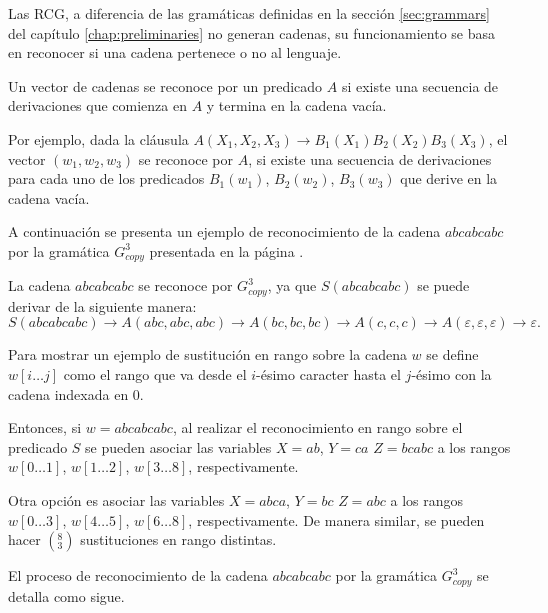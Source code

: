 \documentclass[12pt]{article}
\begin{document}
Las RCG, a diferencia de las gramáticas definidas en la sección \ref{sec:grammars} del capítulo \ref{chap:preliminaries} no generan cadenas, su funcionamiento se basa en reconocer si una cadena pertenece o no al lenguaje.

Un vector de cadenas se reconoce por un predicado $A$ si existe una secuencia de derivaciones que comienza en $A$ y termina en la cadena vacía.

Por ejemplo, dada la cláusula $A(X_1,X_2,X_3)\to B_1(X_1)B_2(X_2)B_3(X_3)$, el vector $(w_1,w_2,w_3)$ se reconoce por $A$, si existe una secuencia de derivaciones para cada uno de los predicados $B_1(w_1)$, $B_2(w_2)$, $B_3(w_3)$ que derive en la cadena vacía.

A continuación se presenta un ejemplo de reconocimiento de la cadena $abcabcabc$ por la gramática $G^3_{copy}$
presentada en la página \pageref{g_3copy}.

La cadena $abcabcabc$ se reconoce por $G^3_{copy}$, ya que $S(abcabcabc)$ se puede derivar de la siguiente manera:
$$S(abcabcabc)\to A(abc,abc,abc)\to A(bc,bc,bc)\to A(c,c,c)\to A(\varepsilon,\varepsilon,\varepsilon)\to \varepsilon.$$

Para mostrar un ejemplo de sustitución en rango sobre la cadena $w$ se define $w[i\dots j]$ como el rango que va desde el $i$-ésimo caracter hasta el $j$-ésimo con la cadena indexada en 0.

Entonces, si $w=abcabcabc$, al realizar el reconocimiento en rango sobre el predicado $S$ se pueden asociar las variables $X=ab$, $Y=ca$ $Z=bcabc$ a los rangos $w[0\dots 1]$, $w[1\dots 2]$, $w[3\dots 8]$, respectivamente.

Otra opción es asociar las variables $X=abca$, $Y=bc$ $Z=abc$ a los rangos $w[0\dots 3]$, $w[4\dots 5]$, $w[6\dots 8]$, respectivamente. De manera similar, se pueden hacer $(^8_3)$ sustituciones en rango distintas. 

El proceso de reconocimiento de la cadena $abcabcabc$ por la gramática $G^3_{copy}$ se detalla como sigue.
\end{document}
